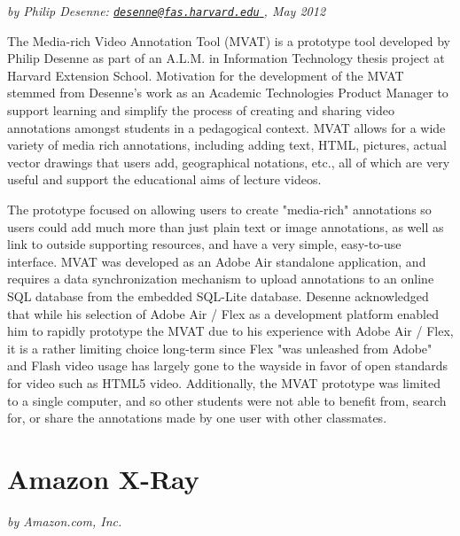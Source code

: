 \textit{by Philip Desenne: \href{mailto:desenne@fas.harvard.edu}{\nolinkurl{desenne@fas.harvard.edu} }, May 2012}

The Media-rich Video Annotation Tool (MVAT) is a prototype tool developed by Philip Desenne as part of an A.L.M. in Information Technology thesis project at Harvard Extension School.  Motivation for the development of the MVAT stemmed from Desenne's work as an Academic Technologies Product Manager to support learning and simplify the process of creating and sharing video annotations amongst students in a pedagogical context.  MVAT allows for a wide variety of media rich annotations, including adding text, HTML, pictures, actual vector drawings that users add, geographical notations, etc., all of which are very useful and support the educational aims of lecture videos.

The prototype focused on allowing users to create "media-rich" annotations so users could add much more than just plain text or image annotations, as well as link to outside supporting resources, and have a very simple, easy-to-use interface.  MVAT was developed as an Adobe Air standalone application, and requires a data synchronization mechanism to upload annotations to an online SQL database from the embedded SQL-Lite database.  Desenne acknowledged that while his selection of Adobe Air / Flex as a development platform enabled him to rapidly prototype the MVAT due to his experience with Adobe Air / Flex, it is a rather limiting choice long-term since Flex "was unleashed from Adobe" and Flash video usage has largely gone to the wayside in favor of open standards for video such as HTML5 video.  Additionally, the MVAT prototype was limited to a single computer, and so other students were not able to benefit from, search for, or share the annotations made by one user with other classmates.




\section{Amazon X-Ray}
\label{sec:priorwork:amazon-x-ray}
\textit{by Amazon.com, Inc.}

